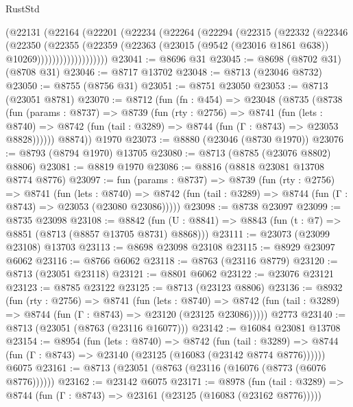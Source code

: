 \begin{lexlean}{RustStd}
\begin{coremodule}
              (@22131
                (@22164
                  (@22201
                    (@22234
                      (@22264
                        (@22294
                          (@22315
                            (@22332
                              (@22346
                                (@22350
                                  (@22355
                                    (@22359
                                      (@22363
                                        (@23015
                                          (@9542 (@23016 @1861 @638))
                                          @10269)))))))))))))))))))
@23041 := @8696 @31
@23045 := @8698 (@8702 @31) (@8708 @31)
@23046 := @8717 @13702
@23048 := @8713 (@23046 @8732)
@23050 := @8755 (@8756 @31)
@23051 := @8751 @23050
@23053 := @8713 (@23051 @8781)
@23070 := @8712
    (fun (fn : @454) =>
    @23048
      (@8735
        (@8738
          (fun (params : @8737) =>
          @8739
            (fun (rty : @2756) =>
            @8741
              (fun (lets : @8740) =>
              @8742 (fun (tail : @3289) => @8744 (fun (Γ : @8743) => @23053 @8828))))))
        @8874))
    @1970
@23073 := @8880 (@23046 (@8730 @1970))
@23076 := @8793 (@8794 @1970) @13705
@23080 := @8713 (@8785 (@23076 @8802) @8806)
@23081 := @8819 @1970
@23086 := @8816 (@8818 @23081 @13708 @8774 @8776)
@23097 := fun (params : @8737) =>
  @8739
    (fun (rty : @2756) =>
    @8741
      (fun (lets : @8740) =>
      @8742 (fun (tail : @3289) => @8744 (fun (Γ : @8743) => @23053 (@23080 @23086)))))
@23098 := @8738 @23097
@23099 := @8735 @23098
@23108 := @8842
    (fun (U : @8841) => @8843 (fun (t : @7) => @8851 (@8713 (@8857 @13705 @8731) @8868)))
@23111 := @23073 (@23099 @23108) @13703
@23113 := @8698 @23098 @23108
@23115 := @8929 @23097 @6062
@23116 := @8766 @6062
@23118 := @8763 (@23116 @8779)
@23120 := @8713 (@23051 @23118)
@23121 := @8801 @6062
@23122 := @23076 @23121
@23123 := @8785 @23122
@23125 := @8713 (@23123 @8806)
@23136 := @8932
    (fun (rty : @2756) =>
    @8741
      (fun (lets : @8740) =>
      @8742 (fun (tail : @3289) => @8744 (fun (Γ : @8743) => @23120 (@23125 @23086)))))
    @2773
@23140 := @8713 (@23051 (@8763 (@23116 @16077)))
@23142 := @16084 @23081 @13708
@23154 := @8954
    (fun (lets : @8740) =>
    @8742
      (fun (tail : @3289) =>
      @8744 (fun (Γ : @8743) => @23140 (@23125 (@16083 (@23142 @8774 @8776))))))
    @6075
@23161 := @8713 (@23051 (@8763 (@23116 (@16076 (@8773 (@6076 @8776))))))
@23162 := @23142 @6075
@23171 := @8978
    (fun (tail : @3289) => @8744 (fun (Γ : @8743) => @23161 (@23125 (@16083 (@23162 @8776)))))

\end{coremodule}
\end{lexlean}
